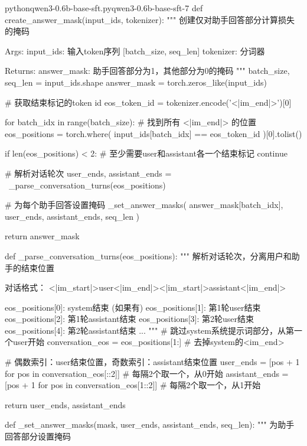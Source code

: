 \documentclass[lang=cn,newtx,10pt,scheme=chinese]{elegantbook}
\begin{document}
\begin{codebox}{python}{qwen3-0.6b-base-sft.py}{qwen3-0.6b-base-sft-7}
def create_answer_mask(input_ids, tokenizer):
    """
    创建仅对助手回答部分计算损失的掩码
    
    Args:
        input_ids: 输入token序列 [batch_size, seq_len]
        tokenizer: 分词器
    
    Returns:
        answer_mask: 助手回答部分为1，其他部分为0的掩码
    """
    batch_size, seq_len = input_ids.shape
    answer_mask = torch.zeros_like(input_ids)
    
    # 获取结束标记的token id
    eos_token_id = tokenizer.encode('<|im_end|>')[0]
    
    for batch_idx in range(batch_size):
        # 找到所有 <|im_end|> 的位置
        eos_positions = torch.where(
            input_ids[batch_idx] == eos_token_id
        )[0].tolist()
        
        if len(eos_positions) < 2:  # 至少需要user和assistant各一个结束标记
            continue
            
        # 解析对话轮次
        user_ends, assistant_ends = \
            _parse_conversation_turns(eos_positions)
        
        # 为每个助手回答设置掩码
        _set_answer_masks(
            answer_mask[batch_idx],
            user_ends,
            assistant_ends,
            seq_len
        )
    
    return answer_mask


def _parse_conversation_turns(eos_positions):
    """
    解析对话轮次，分离用户和助手的结束位置
    
    对话格式：
    <|im_start|>user<|im_end|>\n<|im_start|>assistant<|im_end|>\n
    
    eos_positions[0]: system结束 (如果有)
    eos_positions[1]: 第1轮user结束
    eos_positions[2]: 第1轮assistant结束
    eos_positions[3]: 第2轮user结束
    eos_positions[4]: 第2轮assistant结束
    ...
    """
    # 跳过system系统提示词部分，从第一个user开始
    conversation_eos = eos_positions[1:]  # 去掉system的<im_end>
    
    # 偶数索引：user结束位置，奇数索引：assistant结束位置
    user_ends = [pos + 1 for pos in conversation_eos[::2]] # 每隔2个取一个，从0开始
    assistant_ends = [pos + 1 for pos in conversation_eos[1::2]] # 每隔2个取一个，从1开始
    
    return user_ends, assistant_ends


def _set_answer_masks(mask, user_ends, assistant_ends, seq_len):
    """
    为助手回答部分设置掩码
    

\end{codebox}
\end{document}
